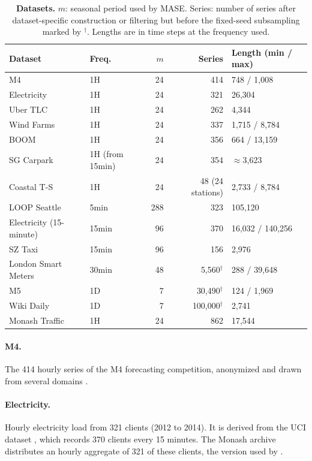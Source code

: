 \documentclass{article} %
\begin{document}
\begin{table}[h]
  \centering
  \small
  \caption{\textbf{Datasets.} $m$: seasonal period used by MASE. Series: number of series after
  dataset-specific construction or filtering but before the fixed-seed subsampling marked by
  $^\dagger$. Lengths are in time steps at the frequency used.}
  \label{tab:datasets}
  \vspace{4pt}
  \begin{tabular}{@{}llrrl@{}}
    \toprule
    Dataset & Freq. & $m$ & Series & Length (min / max) \\
    \midrule
    M4 & 1H & 24 & 414 & 748 / 1,008 \\
    Electricity & 1H & 24 & 321 & 26,304 \\
    Uber TLC & 1H & 24 & 262 & 4,344 \\
    Wind Farms & 1H & 24 & 337 & 1,715 / 8,784 \\
    BOOM & 1H & 24 & 356 & 664 / 13,159 \\
    SG Carpark & 1H (from 15min) & 24 & 354 & $\approx$3,623 \\
    Coastal T-S & 1H & 24 & 48 (24 stations) & 2,733 / 8,784 \\
    LOOP Seattle & 5min & 288 & 323 & 105,120 \\
    Electricity (15-minute) & 15min & 96 & 370 & 16,032 / 140,256 \\
    SZ Taxi & 15min & 96 & 156 & 2,976 \\
    London Smart Meters & 30min & 48 & 5,560$^\dagger$ & 288 / 39,648 \\
    M5 & 1D & 7 & 30,490$^\dagger$ & 124 / 1,969 \\
    Wiki Daily & 1D & 7 & 100,000$^\dagger$ & 2,741 \\
    Monash Traffic & 1H & 24 & 862 & 17,544 \\
    \bottomrule
  \end{tabular}
\end{table}

\paragraph{M4.}
The 414 hourly series of the M4 forecasting competition, anonymized and drawn from several
domains \citep{MAKRIDAKIS202054}.

\paragraph{Electricity.}
Hourly electricity load from 321 clients (2012 to 2014). It is derived from the UCI dataset \citep{electricityloaddiagrams20112014_321}, which records 370 clients every 15 minutes. The Monash archive distributes an hourly aggregate of 321 of these clients, the version used by
\citet{lai2018modelinglongshorttermtemporal}
\citep{godahewa2021monashtimeseriesforecasting}.
\end{document}
